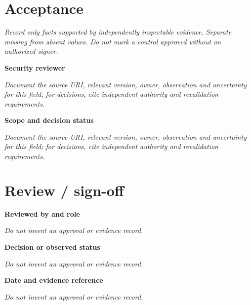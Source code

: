 \documentclass[11pt,letterpaper]{article}
\begin{document}
\section{Acceptance}
\noindent\emph{Record only facts supported by independently inspectable evidence. Separate missing from absent values. Do not mark a control approved without an authorized signer.}\par
\noindent\textbf{Security reviewer}\par
\noindent\emph{Document the source URI, relevant version, owner, observation and uncertainty for this field; for decisions, cite independent authority and revalidation requirements.}\par\medskip
\noindent\textbf{Scope and decision status}\par
\noindent\emph{Document the source URI, relevant version, owner, observation and uncertainty for this field; for decisions, cite independent authority and revalidation requirements.}\par\medskip
\section{Review / sign-off}
\noindent\textbf{Reviewed by and role}\par
\emph{Do not invent an approval or evidence record.}\par\medskip
\noindent\textbf{Decision or observed status}\par
\emph{Do not invent an approval or evidence record.}\par\medskip
\noindent\textbf{Date and evidence reference}\par
\emph{Do not invent an approval or evidence record.}\par\medskip
\end{document}
